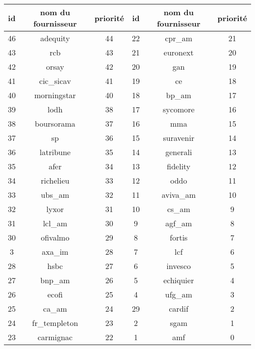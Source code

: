 \begin{tabular}{c|c|c||c|c|c}
id & nom du fournisseur & priorit\'e & id & nom du fournisseur & priorit\'e\\
\hline
46 & adequity & 44 & 22 & cpr{\_}am & 21\\
43 & rcb & 43& 	21 & euronext & 20\\
42 & orsay & 42&	20 & gan & 19\\
41 & cic{\_}sicav & 41&	19 & ce & 18\\
40 & morningstar & 40&	18 & bp{\_}am & 17\\
39 & lodh & 38&	17 & sycomore & 16\\
38 & boursorama & 37&	16 & mma & 15\\
37 & sp & 36&	15 & suravenir & 14\\
36 & latribune & 35&	14 & generali & 13\\
35 & afer & 34&	13 & fidelity & 12\\
34 & richelieu & 33&	12 & oddo & 11\\
33 & ubs{\_}am & 32&	11 & aviva{\_}am & 10\\
32 & lyxor & 31&	10 & cs{\_}am & 9\\
31 & lcl{\_}am & 30&	9 & agf{\_}am & 8\\
30 & ofivalmo & 29&	8 & fortis & 7\\
3 & axa{\_}im & 28&	7 & lcf & 6\\
28 & hsbc & 27&	6 & invesco & 5\\
27 & bnp{\_}am & 26&	5 & echiquier & 4\\
26 & ecofi & 25&	4 & ufg{\_}am & 3\\
25 & ca{\_}am & 24&	29 & cardif & 2\\
24 & fr{\_}templeton & 23&	2 & sgam & 1\\
23 & carmignac & 22&	1 & amf & 0\\
\end{tabular}
